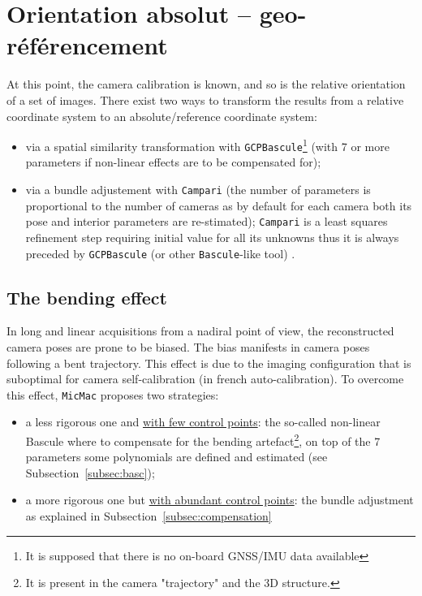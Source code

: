 \documentclass[11pt,a4paper,oneside]{book}
\begin{document}
\section{Orientation absolut -- geo-référencement}
%
At this point, the camera calibration is known, and so is the relative orientation of a set of images. There exist two ways to transform the results from a relative coordinate system to an absolute/reference coordinate system:
\begin{itemize}
\item via a spatial similarity transformation with {\tt GCPBascule}\footnote{It is supposed that there is no on-board GNSS/IMU data available} (with 7 or more parameters if non-linear effects are to be compensated for);
\item via a bundle adjustement with {\tt Campari} (the number of parameters is proportional to the number of cameras as by default for each camera both its pose and interior parameters are re-stimated); {\tt Campari} is a least squares refinement step requiring initial value for all its unknowns thus it is always preceded by {\tt GCPBascule} (or other {\tt Bascule}-like tool) .
\end{itemize}
%
\subsection{The bending effect}
In long and linear acquisitions from a nadiral point of view, the reconstructed camera poses are prone to be biased. The bias manifests in camera poses following a bent trajectory. This effect is due to the imaging configuration that is suboptimal for camera self-calibration (in french auto-calibration). To overcome this effect, {\tt MicMac} proposes two strategies:
\begin{itemize}
\item a less rigorous one and \underline{with few control points}: the so-called non-linear Bascule where  to compensate for the bending artefact\footnote{It is present in the camera "trajectory" and the 3D structure.}, on top of the 7 parameters some polynomials are defined and estimated (see Subsection~\ref{subsec:basc});
\item a more rigorous one but \underline{with abundant control points}: the bundle adjustment as explained in Subsection~\ref{subsec:compensation}
\end{itemize} 
%
\end{document}
